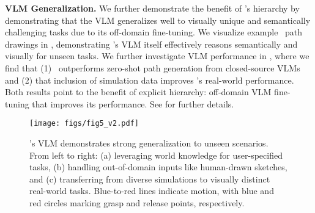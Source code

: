 \textbf{VLM Generalization.} We further demonstrate the benefit of \method's hierarchy by demonstrating that the VLM generalizes well to visually unique and semantically challenging tasks due to its off-domain fine-tuning. 
We visualize example \method\ path drawings in , demonstrating \method's VLM itself effectively reasons semantically and visually for unseen tasks. 
We further investigate VLM performance in , where we find that (1) \method\ outperforms zero-shot path generation from closed-source VLMs \citep{gu2023rttrajectory, liang2023code} and (2) that inclusion of simulation data improves \method's real-world performance. 
Both results point to the benefit of explicit hierarchy: off-domain VLM fine-tuning that improves its performance.
See  for further details.



\begin{figure}[t]
    \centering
    \texttt{[image: figs/fig5\_v2.pdf]}
    \vspace{-0.7cm}
    \caption{\footnotesize{\method's VLM demonstrates strong generalization to unseen scenarios. From left to right: (a) leveraging world knowledge for user-specified tasks, (b) handling out-of-domain inputs like human-drawn sketches, and (c) transferring from diverse simulations to visually distinct real-world tasks. Blue-to-red lines indicate motion, with blue and red circles marking grasp and release points, respectively.} }
    \label{fig:vlm_generalization}
    \vspace{-4mm}
\end{figure}




